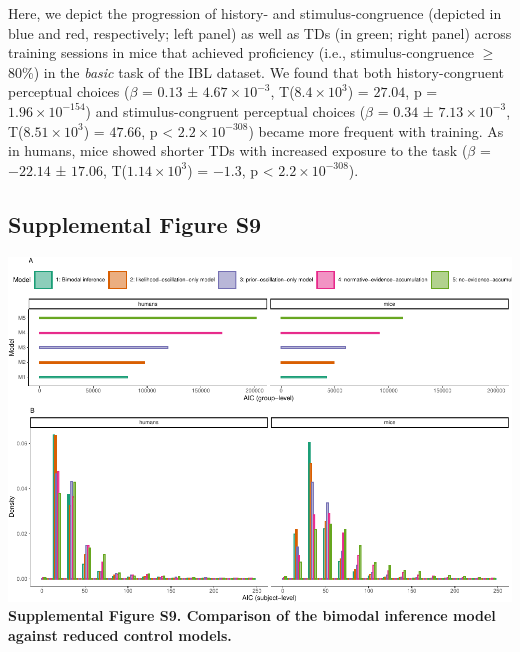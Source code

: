 \documentclass[
]{article}
\begin{document}
Here, we depict the progression of history- and stimulus-congruence
(depicted in blue and red, respectively; left panel) as well as TDs (in
green; right panel) across training sessions in mice that achieved
proficiency (i.e., stimulus-congruence \(\geq\) 80\%) in the
\emph{basic} task of the IBL dataset. We found that both
history-congruent perceptual choices (\(\beta\) = \(0.13\) ±
\(\ensuremath{4.67\times 10^{-3}}\),
T(\(\ensuremath{8.4\times 10^{3}}\)) = \(27.04\), p =
\(\ensuremath{1.96\times 10^{-154}}\)) and stimulus-congruent perceptual
choices (\(\beta\) = \(0.34\) ± \(\ensuremath{7.13\times 10^{-3}}\),
T(\(\ensuremath{8.51\times 10^{3}}\)) = \(47.66\), p < \(\ensuremath{2.2\times 10^{-308}}\)) became
more frequent with training. As in humans, mice showed shorter TDs with
increased exposure to the task (\(\beta\) = \(-22.14\) ± \(17.06\),
T(\(\ensuremath{1.14\times 10^{3}}\)) = \(-1.3\), p < \(\ensuremath{2.2\times 10^{-308}}\)).

\newpage

\hypertarget{supplemental-figure-s9}{%
\subsection{Supplemental Figure S9}\label{supplemental-figure-s9}}

\includegraphics{modes_mouse_rev1b_clean_files/figure-latex/Supplemental_Figure_S9-1.pdf}
\textbf{Supplemental Figure S9. Comparison of the bimodal inference
model against reduced control models.}
\end{document}
